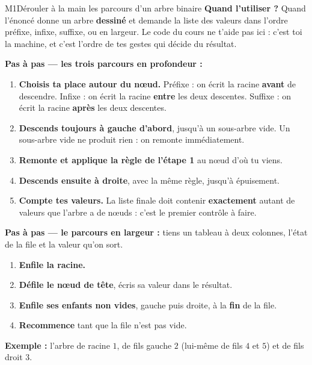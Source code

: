 \begin{fichemethode}{M1}{Dérouler à la main les parcours d'un arbre binaire}
\textbf{Quand l'utiliser ?} Quand l'énoncé donne un arbre \textbf{dessiné} et demande la
liste des valeurs dans l'ordre préfixe, infixe, suffixe, ou en largeur. Le code du cours ne
t'aide pas ici : c'est toi la machine, et c'est l'ordre de tes gestes qui décide du résultat.

\textbf{Pas à pas — les trois parcours en profondeur :}
\begin{enumerate}
  \item \textbf{Choisis ta place autour du nœud.} Préfixe : on écrit la racine \textbf{avant}
    de descendre. Infixe : on écrit la racine \textbf{entre} les deux descentes. Suffixe : on
    écrit la racine \textbf{après} les deux descentes.
  \item \textbf{Descends toujours à gauche d'abord}, jusqu'à un sous-arbre vide. Un
    sous-arbre vide ne produit rien : on remonte immédiatement.
  \item \textbf{Remonte et applique la règle de l'étape 1} au nœud d'où tu viens.
  \item \textbf{Descends ensuite à droite}, avec la même règle, jusqu'à épuisement.
  \item \textbf{Compte tes valeurs.} La liste finale doit contenir \textbf{exactement} autant
    de valeurs que l'arbre a de nœuds : c'est le premier contrôle à faire.
\end{enumerate}

\textbf{Pas à pas — le parcours en largeur :} tiens un tableau à deux colonnes, l'état de la
file et la valeur qu'on sort.
\begin{enumerate}
  \item \textbf{Enfile la racine.}
  \item \textbf{Défile le nœud de tête}, écris sa valeur dans le résultat.
  \item \textbf{Enfile ses enfants non vides}, gauche puis droite, à la \textbf{fin} de la
    file.
  \item \textbf{Recommence} tant que la file n'est pas vide.
\end{enumerate}

\textbf{Exemple :} l'arbre de racine $1$, de fils gauche $2$ (lui-même de fils $4$ et $5$) et
de fils droit $3$.


\end{fichemethode}
